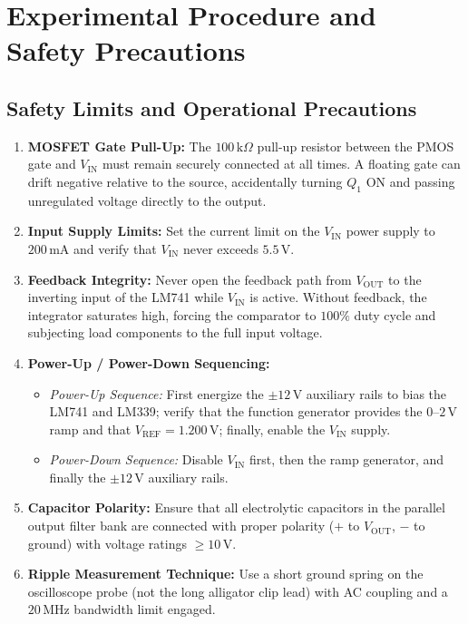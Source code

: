 \documentclass[12pt,a4paper]{article}
\newcommand{\Vout}{V_{\mathrm{OUT}}}
\newcommand{\Vin}{V_{\mathrm{IN}}}
\newcommand{\Vref}{V_{\mathrm{REF}}}
\begin{document}
\section{Experimental Procedure and Safety Precautions}
\label{sec:procedure}

\subsection{Safety Limits and Operational Precautions}
\begin{enumerate}[leftmargin=1.5em]
    \item \textbf{MOSFET Gate Pull-Up:} The $100\,\mathrm{k}\Omega$ pull-up resistor between the PMOS gate and $\Vin$ must remain securely connected at all times. A floating gate can drift negative relative to the source, accidentally turning $Q_1$ ON and passing unregulated voltage directly to the output.
    \item \textbf{Input Supply Limits:} Set the current limit on the $\Vin$ power supply to $200\,\mathrm{mA}$ and verify that $\Vin$ never exceeds $5.5\,\mathrm{V}$.
    \item \textbf{Feedback Integrity:} Never open the feedback path from $\Vout$ to the inverting input of the LM741 while $\Vin$ is active. Without feedback, the integrator saturates high, forcing the comparator to $100\%$ duty cycle and subjecting load components to the full input voltage.
    \item \textbf{Power-Up / Power-Down Sequencing:}
    \begin{itemize}
        \item \emph{Power-Up Sequence:} First energize the $\pm 12\,\mathrm{V}$ auxiliary rails to bias the LM741 and LM339; verify that the function generator provides the $0\text{--}2\,\mathrm{V}$ ramp and that $\Vref = 1.200\,\mathrm{V}$; finally, enable the $\Vin$ supply.
        \item \emph{Power-Down Sequence:} Disable $\Vin$ first, then the ramp generator, and finally the $\pm 12\,\mathrm{V}$ auxiliary rails.
    \end{itemize}
    \item \textbf{Capacitor Polarity:} Ensure that all electrolytic capacitors in the parallel output filter bank are connected with proper polarity ($+$ to $\Vout$, $-$ to ground) with voltage ratings $\ge 10\,\mathrm{V}$.
    \item \textbf{Ripple Measurement Technique:} Use a short ground spring on the oscilloscope probe (not the long alligator clip lead) with AC coupling and a $20\,\mathrm{MHz}$ bandwidth limit engaged.
\end{enumerate}
\end{document}
